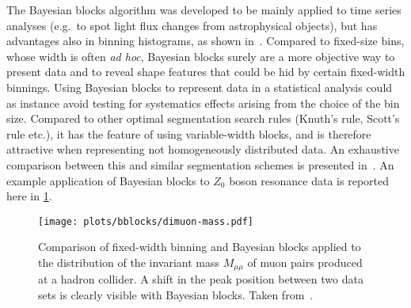 The Bayesian blocks algorithm was developed to be mainly applied to time series analyses
(e.g.~to spot light flux changes from astrophysical objects), but has advantages also in
binning histograms, as shown in~\cite{Pollack2017}. Compared to fixed-size bins, whose
width is often \emph{ad hoc}, Bayesian blocks surely are a more objective way to present
data and to reveal shape features that could be hid by certain fixed-width binnings. Using
Bayesian blocks to represent data in a statistical analysis could as instance avoid testing for
systematics effects arising from the choice of the bin size. Compared to other
optimal segmentation search rules (Knuth's rule, Scott's rule etc.), it has the feature of
using variable-width blocks, and is therefore attractive when representing not
homogeneously distributed data. An exhaustive comparison between this and similar
segmentation schemes is presented in~\cite{Pollack2017}. An example application of
Bayesian blocks to $Z_0$ boson resonance data is reported here in
\cref{fig:bayesblocks:dimuon}.
\begin{figure}
  \centering
  \texttt{[image: plots/bblocks/dimuon-mass.pdf]}
  \caption{
    Comparison of fixed-width binning and Bayesian blocks applied to the distribution of
    the invariant mass $M_{\mu\mu}$ of muon pairs produced at a hadron collider. A shift
    in the peak position between two data sets is clearly visible with Bayesian blocks.
    Taken from~\cite{Pollack2017}.
  }\label{fig:bayesblocks:dimuon}
\end{figure}


